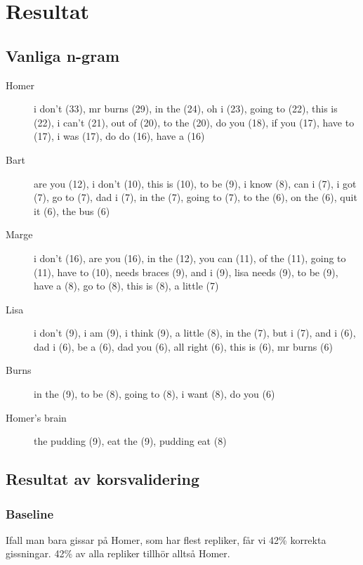\documentclass[a5paper]{article}
\begin{document}
\section{Resultat}
\subsection{Vanliga n-gram}
\begin{description}
    \item[Homer] i don't (33), mr burns (29), in the (24), oh i (23), going to (22), this is (22), i can't (21), out of (20), to the (20), do you (18), if you (17), have to (17), i was (17), do do (16), have a (16)

    \item[Bart] are you (12), i don't (10), this is (10), to be (9), i know (8), can i (7), i got (7), go to (7), dad i (7), in the (7), going to (7), to the (6), on the (6), quit it (6), the bus (6)

    \item[Marge] i don't (16), are you (16), in the (12), you can (11), of the (11), going to (11), have to (10), needs braces (9), and i (9), lisa needs (9), to be (9), have a (8), go to (8), this is (8), a little (7)

    \item[Lisa] i don't (9), i am (9), i think (9), a little (8), in the (7), but i (7), and i (6), dad i (6), be a (6), dad you (6), all right (6), this is (6), mr burns (6)

    \item[Burns] in the (9), to be (8), going to (8), i want (8), do you (6)

    \item[Homer's brain] the pudding (9), eat the (9), pudding eat (8)
\end{description}
        
\subsection{Resultat av korsvalidering}

\subsubsection{Baseline}
Ifall man bara gissar på Homer, som har flest repliker, får vi 42\% korrekta
gissningar. 42\% av alla repliker tillhör alltså Homer.
\end{document}
